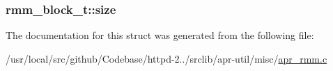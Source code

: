 \subsubsection[{\texorpdfstring{size}{size}}]{ rmm\+\_\+block\+\_\+t\+::size}\hypertarget{structrmm__block__t_a63d53f13f4160a3d45c2111775516b69}{}\label{structrmm__block__t_a63d53f13f4160a3d45c2111775516b69}


The documentation for this struct was generated from the following file\+:\begin{DoxyCompactItemize}
\item 
/usr/local/src/github/\+Codebase/httpd-\/2../srclib/apr-\/util/misc/\hyperlink{apr__rmm_8c}{apr\+\_\+rmm.\+c}\end{DoxyCompactItemize}
